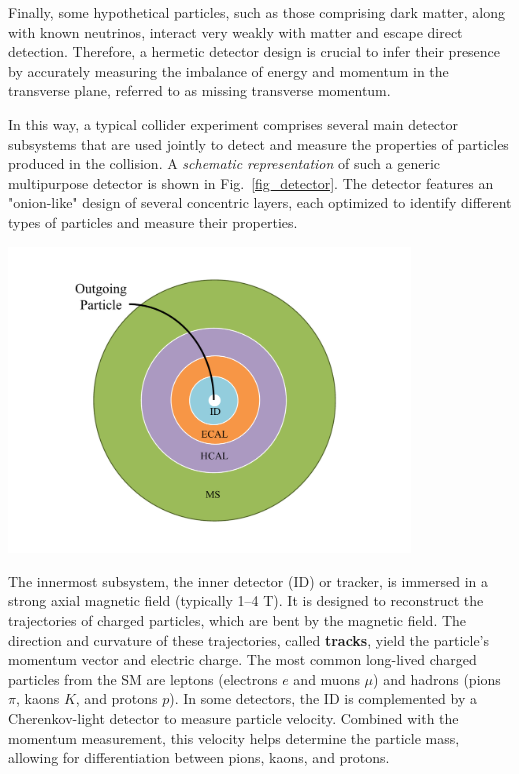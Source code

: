 Finally, some hypothetical particles, such as those comprising dark matter, along with known neutrinos, interact very weakly with matter and escape direct detection. Therefore, a hermetic detector design is crucial to infer their presence by accurately measuring the imbalance of energy and momentum in the transverse plane, referred to as missing transverse momentum.


In this way, a typical collider experiment comprises several main detector subsystems that are used jointly to detect and measure the properties of particles produced in the collision. A \textit{schematic representation} of such a generic multipurpose detector is shown in Fig.~\ref{fig_detector}. The detector features an "onion-like" design of several concentric layers, each optimized to identify different types of particles and measure their properties.

\begin{center}
    \includegraphics[width=0.8\textwidth]{Images/transversal_detector.pdf}
    \label{fig_detector}
\end{center}

The innermost subsystem, the inner detector (ID) or tracker, is immersed in a strong axial magnetic field (typically 1–4 T). It is designed to reconstruct the trajectories of charged particles, which are bent by the magnetic field. The direction and curvature of these trajectories, called \textbf{tracks}, yield the particle's momentum vector and electric charge. The most common long-lived charged particles from the SM are leptons (electrons $e$ and muons $\mu$) and hadrons (pions $\pi$, kaons $K$, and protons $p$). In some detectors, the ID is complemented by a Cherenkov-light detector to measure particle velocity. Combined with the momentum measurement, this velocity helps determine the particle mass, allowing for differentiation between pions, kaons, and protons.


